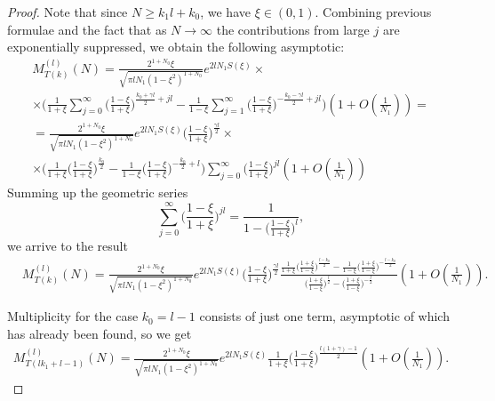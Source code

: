 \documentclass[11pt]{amsart}
\begin{document}
\begin{proof}
    
	Note that since $N\geq k_1l+k_0$, we have $\xi\in(0,1)$. Combining previous formulae 
	and the fact that as $N\to\infty$ the contributions from large $j$ are exponentially suppressed,
	we obtain the following asymptotic: 
	\begin{eqnarray*}
		M^{(l)}_{T(k)}(N)=\frac{2^{1+N_0}\xi}{\sqrt{\pi lN_1 (1-\xi^2)^{1+N_0}}}e^{2lN_1S(\xi)}\times\\
		\times\Big(\frac{1}{1+\xi}\sum_{j=0}^\infty\Big(\frac{1-\xi}{1+\xi}\Big)^{\frac{k_0+\gamma l}{2}+jl}-\frac{1}{1-\xi}\sum_{j=1}^\infty\Big(\frac{1-\xi}{1+\xi}\Big)^{-\frac{k_0-\gamma l}{2}+jl} \Big)\left(1+O\left(\frac{1}{N_1}\right)\right)=\\
		=\frac{2^{1+N_0}\xi}{\sqrt{\pi lN_1 (1-\xi^2)^{1+N_0}}}e^{2lN_1S(\xi)}\Big(\frac{1-\xi}{1+\xi}\Big)^{\frac{\gamma l}{2}}\times\\
        \times\Big(\frac{1}{1+\xi}\Big(\frac{1-\xi}{1+\xi}\Big)^{\frac{k_0}{2}}-\frac{1}{1-\xi}\Big(\frac{1-\xi}{1+\xi}\Big)^{-\frac{k_0}{2}+l} \Big)\sum_{j=0}^\infty\Big(\frac{1-\xi}{1+\xi}\Big)^{jl}\left(1+O\left(\frac{1}{N_1}\right)\right)
	\end{eqnarray*}
	Summing up the geometric series
	\begin{equation*}
		\sum_{j=0}^\infty\Big(\frac{1-\xi}{1+\xi}\Big)^{jl}=\frac{1}{1-\Big(\frac{1-\xi}{1+\xi}\Big)^{l}},
	\end{equation*}
	we arrive to the result 
	\begin{eqnarray*}
		&M^{(l)}_{T(k)}(N)=\frac{2^{1+N_0}\xi}{\sqrt{\pi lN_1 (1-\xi^2)^{1+N_0}}}e^{2lN_1S(\xi)}\Big(\frac{1-\xi}{1+\xi}\Big)^{\frac{\gamma l}{2}}\frac{\frac{1}{1+\xi}\Big(\frac{1+\xi}{1-\xi}\Big)^{\frac{l-k_0}{2}}-\frac{1}{1-\xi}\Big(\frac{1+\xi}{1-\xi}\Big)^{-\frac{l-k_0}{2}}}{\Big(\frac{1+\xi}{1-\xi}\Big)^{\frac{l}{2}}-\Big(\frac{1+\xi}{1-\xi}\Big)^{-\frac{l}{2}}}\left(1+O\left(\frac{1}{N_1}\right)\right).
	\end{eqnarray*}

 
	Multiplicity for the case $k_0=l-1$ consists of just one term, asymptotic of which has already been found, so we get
	\begin{eqnarray*}
		M^{(l)}_{T(lk_1+l-1)}(N)=\frac{2^{1+N_0}\xi}{\sqrt{\pi lN_1(1-\xi^2)^{1+N_0}}}e^{2lN_1S(\xi)}\frac{1}{1+\xi}\Big(\frac{1-\xi}{1+\xi}\Big)^{\frac{l(1+\gamma)-1}{2}}\left(1+O\left(\frac{1}{N_1}\right)\right).
	\end{eqnarray*}
\end{proof}
\end{document}
